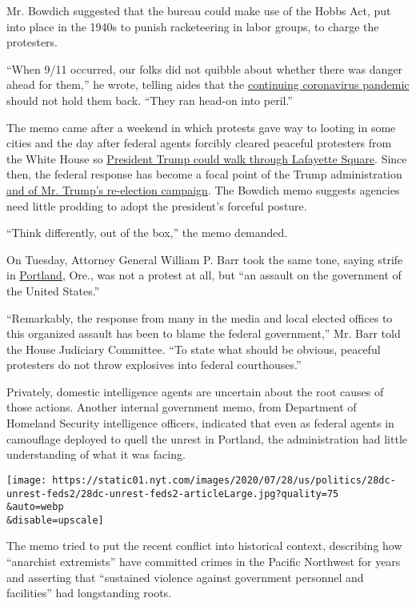Mr. Bowdich suggested that the bureau could make use of the Hobbs Act,
put into place in the 1940s to punish racketeering in labor groups, to
charge the protesters.

``When 9/11 occurred, our folks did not quibble about whether there was
danger ahead for them,'' he wrote, telling aides that the
\href{https://www.nytimes.com/interactive/2020/us/coronavirus-us-cases.html}{continuing
coronavirus pandemic} should not hold them back. ``They ran head-on into
peril.''

The memo came after a weekend in which protests gave way to looting in
some cities and the day after federal agents forcibly cleared peaceful
protesters from the White House so
\href{https://www.nytimes.com/2020/06/02/us/politics/trump-walk-lafayette-square.html}{President
Trump could walk through Lafayette Square}. Since then, the federal
response has become a focal point of the Trump administration
\href{https://www.nytimes.com/2020/07/21/us/politics/trump-portland-federal-agents.html}{and
of Mr. Trump's re-election campaign}. The Bowdich memo suggests agencies
need little prodding to adopt the president's forceful posture.

``Think differently, out of the box,'' the memo demanded.

On Tuesday, Attorney General William P. Barr took the same tone, saying
strife in
\href{https://www.nytimes.com/2020/07/29/us/protests-portland-federal-withdrawal.html}{Portland},
Ore., was not a protest at all, but ``an assault on the government of
the United States.''

``Remarkably, the response from many in the media and local elected
offices to this organized assault has been to blame the federal
government,'' Mr. Barr told the House Judiciary Committee. ``To state
what should be obvious, peaceful protesters do not throw explosives into
federal courthouses.''

Privately, domestic intelligence agents are uncertain about the root
causes of those actions. Another internal government memo, from
Department of Homeland Security intelligence officers, indicated that
even as federal agents in camouflage deployed to quell the unrest in
Portland, the administration had little understanding of what it was
facing.

\texttt{[image: https://static01.nyt.com/images/2020/07/28/us/politics/28dc-unrest-feds2/28dc-unrest-feds2-articleLarge.jpg?quality=75\\\&auto=webp\\\&disable=upscale]}

The memo tried to put the recent conflict into historical context,
describing how ``anarchist extremists'' have committed crimes in the
Pacific Northwest for years and asserting that ``sustained violence
against government personnel and facilities'' had longstanding roots.

